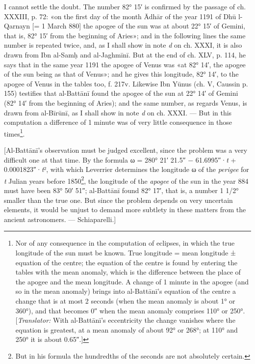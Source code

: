 \documentclass[11pt]{article}
\newcommand{\Pg}[1]{\marginpar{\footnotesize\color{gray}#1}}
\begin{document}
\par I cannot settle the doubt. The number 82° 15′ is confirmed by the passage of ch. XXXIII, p. 72: «on the first day of the month Ādhār of the year 1191 of Dhū l-Qarnayn [= 1 March 880] the apogee of the sun was at about 22° 15′ of Gemini, that is, 82° 15′ from the beginning of Aries»; and in the following lines the same number is repeated twice, and, as I shall show in note \emph{d} on ch. XXXI, it is also drawn from Ibn al-Samḥ and al-Jaghmīnī. But at the end of ch. XLV, p. 114, he says that in the same year 1191 the apogee of Venus was «at 82° 14′, the apogee of the sun being as that of Venus»; and he gives this longitude, 82° 14′, to the apogee of Venus in the tables too, f. 217v. Likewise Ibn Yūnus (ch. V, Caussin p. 155) testifies that al-Battānī found the apogee of the sun at 22° 14′ of Gemini (82° 14′ from the beginning of Aries); and the same number, as regards Venus, is drawn from al-Bīrūnī, as I shall show in note \emph{d} on ch. XXXI. — But in this computation a difference of 1 minute was of very little consequence in those times\footnote{Nor of any consequence in the computation of eclipses, in which the true longitude of the sun must be known. True longitude = mean longitude ± equation of the centre; the equation of the centre is found by entering the tables with the mean anomaly, which is the difference between the place of the apogee and the mean longitude. A change of 1 minute in the apogee (and so in the mean anomaly) brings into al-Battānī's equation of the centre a change that is at most 2 seconds (when the mean anomaly is about 1° or 360°), and that becomes 0″ when the mean anomaly comprises 110° or 250°. [\emph{Translator:} With al-Battānī's eccentricity the change vanishes where the equation is greatest, at a mean anomaly of about 92° or 268°; at 110° and 250° it is about 0.65″.]}.\par
\par \Pg{I 215}[Al-Battānī's observation must be judged excellent, since the problem was a very difficult one at that time. By the formula {\greekfont ω} = 280° 21′ 21.5″ − 61.6995″·\emph{t} + 0.0001823″·\emph{t}², with which Leverrier determines the longitude {\greekfont ω} of the \emph{perigee} for \emph{t} Julian years before 1850\footnote{But in his formula the hundredths of the seconds are not absolutely certain.}, the longitude of the \emph{apogee} of the sun in the year 884 must have been 83° 50′ 51″; al-Battānī found 82° 17′, that is, a number 1 1/2° smaller than the true one. But since the problem depends on very uncertain elements, it would be unjust to demand more subtlety in these matters from the ancient astronomers. — Schiaparelli.]\par
\end{document}
